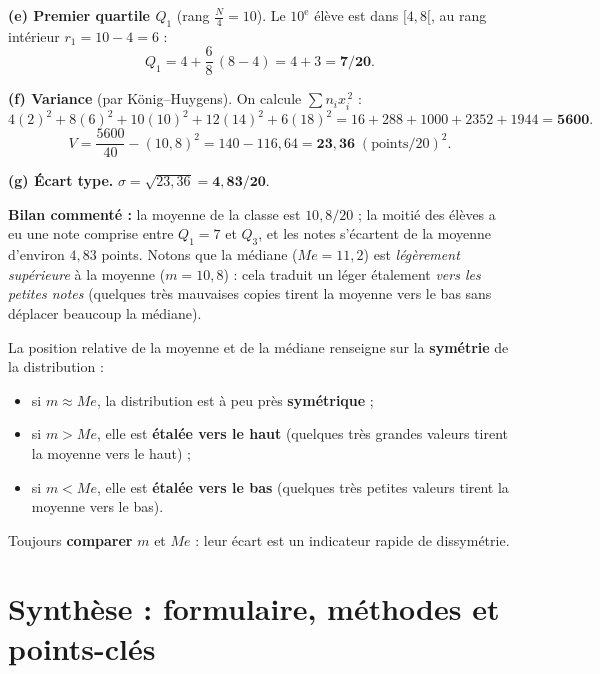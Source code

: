 \documentclass[11pt,a4paper]{article}
\newcommand{\ect}{\sigma}                %
\newcommand{\med}{M\!e}                  %
\begin{document}
\begin{exemple}[notes d'un test sur 20, $N=40$ élèves --- fiche]
\textbf{(e) Premier quartile $Q_1$} (rang $\tfrac{N}{4}=10$). Le $10^{\text{e}}$ élève est dans
$[4,8[$, au rang intérieur $r_1=10-4=6$ :
\[
Q_1=4+\frac{6}{8}\,(8-4)=4+3=\mathbf{7/20}.
\]

\textbf{(f) Variance} (par König--Huygens). On calcule $\sum n_i x_i^{\,2}$ :
\[
4(2)^2+8(6)^2+10(10)^2+12(14)^2+6(18)^2
=16+288+1000+2352+1944=\mathbf{5600}.
\]
\[ V=\dfrac{5600}{40}-(10{,}8)^2=140-116{,}64=\mathbf{23{,}36}\;(\text{points}/20)^2. \]

\textbf{(g) Écart type.}
\(\ect=\sqrt{23{,}36}=\mathbf{4{,}83/20}\).

\medskip
\textbf{Bilan commenté :} la moyenne de la classe est $10{,}8/20$ ; la moitié des élèves a eu une note
comprise entre $Q_1=7$ et $Q_3$, et les notes s'écartent de la moyenne d'environ $4{,}83$ points.
Notons que la médiane ($\med=11{,}2$) est \emph{légèrement supérieure} à la moyenne ($m=10{,}8$) :
cela traduit un léger étalement \emph{vers les petites notes} (quelques très mauvaises copies tirent
la moyenne vers le bas sans déplacer beaucoup la médiane).
\end{exemple}

\begin{attention}[règle de lecture : comparer $m$ et $\med$]
La position relative de la moyenne et de la médiane renseigne sur la \textbf{symétrie} de la
distribution :
\begin{itemize}[leftmargin=1.6em,topsep=1pt,itemsep=1pt]
  \item si $m\approx\med$, la distribution est à peu près \textbf{symétrique} ;
  \item si $m>\med$, elle est \textbf{étalée vers le haut} (quelques très grandes valeurs tirent la
        moyenne vers le haut) ;
  \item si $m<\med$, elle est \textbf{étalée vers le bas} (quelques très petites valeurs tirent la
        moyenne vers le bas).
\end{itemize}
Toujours \textbf{comparer} $m$ et $\med$ : leur écart est un indicateur rapide de dissymétrie.
\end{attention}

\section{Synthèse : formulaire, méthodes et points-clés}
\end{document}
